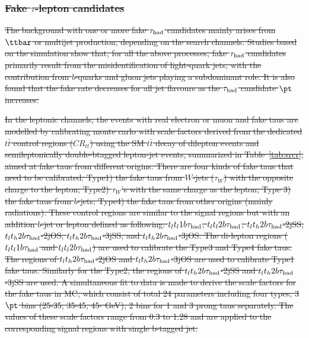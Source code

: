 \documentclass[PAPER, coverpage, atlasdraft=true, texlive=2016, UKenglish]{\ATLASLATEXPATH atlasdoc}
\providecommand{\DIFdel}[1]{{\protect\color{red}\sout{#1}}}                      %
\providecommand{\DIFdelbegin}{} %
\begin{document}
\DIFdelbegin \subsubsection{\DIFdel{Fake $\tau$-lepton candidates}}
\addtocounter{subsubsection}{-1}%
\DIFdel{The background with one or more fake $\tau_{\mathrm{had}}$ candidates mainly arises from $\ttbar$ or
multijet production, depending on the search channels.
Studies based on the simulation show that, for all the above processes, fake $\tau_{\mathrm{had}}$ candidates primarily result from the
misidentification of light-quark jets, with the contribution from $b$-quarks and gluon jets playing a subdominant role.
It is also found that the fake rate decreases for all jet flavours as the $\tau_{\mathrm{had}}$ candidate $\pt$ increases.
}%

\DIFdel{In the leptonic channels, the events with real electron or muon and fake taus are modelled by calibrating monte carlo with scale factors
derived from the dedicated $t\bar t$
control regions ($CR_{tt}$) using the SM $t\bar t$ decay of dilepton events and semileptonically double-btagged lepton-jet events, summarized in Table~\ref{tab:srcr},
aimed at fake taus from different origins. There are four kinds of fake taus that need to be calibrated: Type1) the fake taus from $W$-jets ($\tau_{W}$)
with the opposite charge to the lepton;
Type2) $\tau_{W}$'s with the same charge as the lepton; Type 3) the fake taus from $b$-jets; Type4) the fake taus from other origins (mainly radiations).
These control regions are similar to the signal regions but with an addition $b$-jet or lepton defined as following:
$t_lt_l1b\tau_\text{had}$, $t_lt_l2b\tau_\text{had}$, $t_lt_h2b\tau_\text{had}$-2jSS, $t_lt_h2b\tau_\text{had}$-2jOS, $t_lt_h2b\tau_\text{had}$-3jSS, and $t_lt_h2b\tau_\text{had}$-3jOS.
The di-lepton regions ($t_lt_l1b\tau_\text{had}$ and $t_lt_l2b\tau_\text{had}$) are used to calibrate the Type3 and Type4 fake taus. The regions of
$t_lt_h2b\tau_\text{had}$-2jOS and $t_lt_h2b\tau_\text{had}$-3jOS are used to calibrate Type1 fake taus.
Similarly for the Type2, the regions of $t_lt_h2b\tau_\text{had}$-2jSS and $t_lt_h2b\tau_\text{had}$-3jSS are used.
A simultaneous fit to data is made to derive the scale factors for the fake taus in MC, which consist of total 24 parameters
including four types, 3 $\pt$ bins (25-35, 35-45, 45- GeV), 2 bins for 1 and 3 prong taus separately.
The values of these scale factors range from 0.3 to 1.28 and are applied to the corresponding signal regions with single b-tagged jet.
}%
\end{document}
